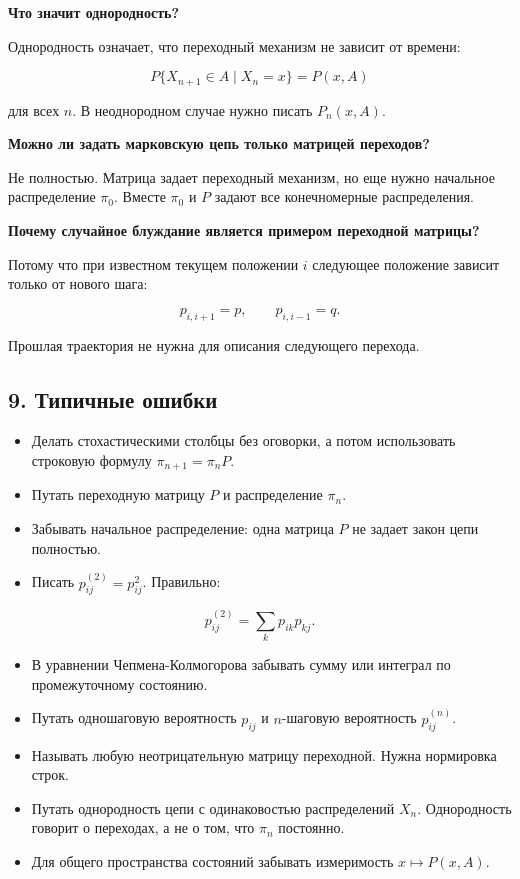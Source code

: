 \documentclass[
  11pt,
  a4paper,
]{article}
\providecommand{\tightlist}{%
  \setlength{\itemsep}{0pt}\setlength{\parskip}{0pt}}
\begin{document}
\textbf{Что значит однородность?}

Однородность означает, что переходный механизм не зависит от времени:

\[
P\{X_{n+1}\in A\mid X_n=x\}=P(x,A)
\]

для всех \(n\). В неоднородном случае нужно писать \(P_n(x,A)\).

\textbf{Можно ли задать марковскую цепь только матрицей переходов?}

Не полностью. Матрица задает переходный механизм, но еще нужно начальное
распределение \(\pi_0\). Вместе \(\pi_0\) и \(P\) задают все
конечномерные распределения.

\textbf{Почему случайное блуждание является примером переходной
матрицы?}

Потому что при известном текущем положении \(i\) следующее положение
зависит только от нового шага:

\[
p_{i,i+1}=p,
\qquad
p_{i,i-1}=q.
\]

Прошлая траектория не нужна для описания следующего перехода.

\subsection{9. Типичные
ошибки}\label{ux442ux438ux43fux438ux447ux43dux44bux435-ux43eux448ux438ux431ux43aux438}

\begin{itemize}
\tightlist
\item
  Делать стохастическими столбцы без оговорки, а потом использовать
  строковую формулу \(\pi_{n+1}=\pi_nP\).
\item
  Путать переходную матрицу \(P\) и распределение \(\pi_n\).
\item
  Забывать начальное распределение: одна матрица \(P\) не задает закон
  цепи полностью.
\item
  Писать \(p_{ij}^{(2)}=p_{ij}^2\). Правильно:
\end{itemize}

\[
p_{ij}^{(2)}=\sum_kp_{ik}p_{kj}.
\]

\begin{itemize}
\tightlist
\item
  В уравнении Чепмена-Колмогорова забывать сумму или интеграл по
  промежуточному состоянию.
\item
  Путать одношаговую вероятность \(p_{ij}\) и \(n\)-шаговую вероятность
  \(p_{ij}^{(n)}\).
\item
  Называть любую неотрицательную матрицу переходной. Нужна нормировка
  строк.
\item
  Путать однородность цепи с одинаковостью распределений \(X_n\).
  Однородность говорит о переходах, а не о том, что \(\pi_n\) постоянно.
\item
  Для общего пространства состояний забывать измеримость
  \(x\mapsto P(x,A)\).
\end{itemize}
\end{document}
